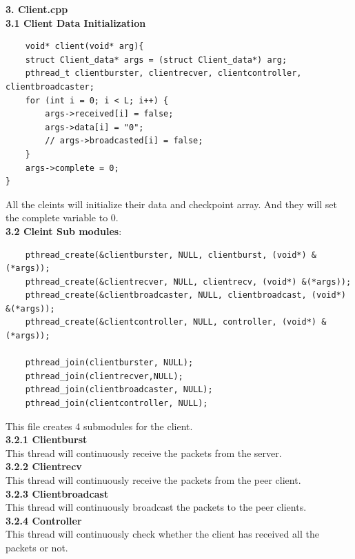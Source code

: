 \documentclass[12pt]{scrartcl}
\begin{document}
\textbf{3. Client.cpp}\\
\textbf{3.1 Client Data Initialization}
\begin{verbatim}
    void* client(void* arg){
    struct Client_data* args = (struct Client_data*) arg;
    pthread_t clientburster, clientrecver, clientcontroller, clientbroadcaster;
    for (int i = 0; i < L; i++) {
        args->received[i] = false;
        args->data[i] = "0";
        // args->broadcasted[i] = false;
    }
    args->complete = 0;
}
\end{verbatim}
All the cleints will initialize their data and checkpoint array. And they will set the complete variable to 0.\\
\textbf{3.2 Cleint Sub modules}:\\
\begin{verbatim}
    pthread_create(&clientburster, NULL, clientburst, (void*) &(*args));
    pthread_create(&clientrecver, NULL, clientrecv, (void*) &(*args));
    pthread_create(&clientbroadcaster, NULL, clientbroadcast, (void*) &(*args));
    pthread_create(&clientcontroller, NULL, controller, (void*) &(*args));

    pthread_join(clientburster, NULL);
    pthread_join(clientrecver,NULL);
    pthread_join(clientbroadcaster, NULL);
    pthread_join(clientcontroller, NULL);
\end{verbatim}
This file creates 4 submodules for the client.\\
\textbf{3.2.1 Clientburst}\\
This thread will continuously receive the packets from the server.\\
\textbf{3.2.2 Clientrecv}\\
This thread will continuously receive the packets from the peer client.\\
\textbf{3.2.3 Clientbroadcast}\\
This thread will continuously broadcast the packets to the peer clients.\\
\textbf{3.2.4 Controller}\\
This thread will continuously check whether the client has received all the packets or not.\\
\end{document}
